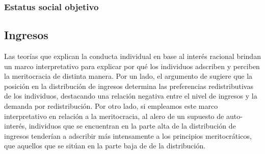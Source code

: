 \documentclass[12pt]{article}
\begin{document}
%


\subsubsection{Estatus social objetivo}

\subsection*{Ingresos}

Las teorías que explican la conducta individual en base al interés racional brindan un marco interpretativo para explicar por qué los individuos adscriben y perciben la meritocracia de distinta manera. Por un lado, el argumento de \citet{Meltzer1981} sugiere que la posición en la distribución de ingresos determina las preferencias redistributivas de los individuos, destacando una relación negativa entre el nivel de ingresos y la demanda por redistribución. Por otro lado, si empleamos este marco interpretativo en relación a la meritocracia, al alero de un supuesto de auto-interés, individuos que se encuentran en la parte alta de la distribución de ingresos tenderían a adscribir más intensamente a los principios meritocráticos, que aquellos que se sitúan en la parte baja de de la distribución. 
\end{document}
